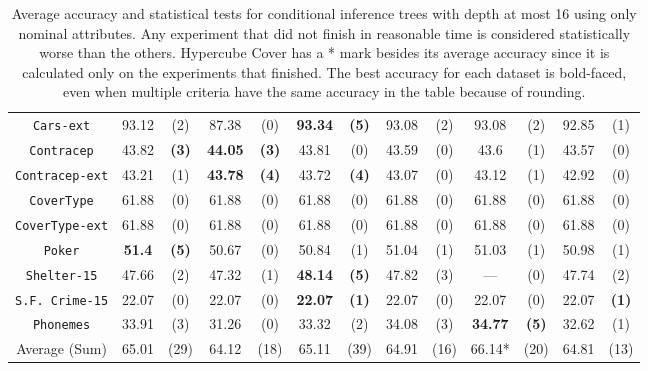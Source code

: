 \begin{table}
\begin{tabular}{c|cc|cc|cc|cc|cc|cc}
{\tt Cars-ext}      & 93.12      &  (2)              &   87.38      & (0)             & {\bf 93.34} &  {\bf (5)}           & 93.08       & (2)             & 93.08       & (2)         & 92.85       & (1)         \\
{\tt Contracep}     & 43.82      &  {\bf (3)}        &   {\bf 44.05}& {\bf (3)}       &  43.81      &  (0)                 & 43.59       & (0)             & 43.6        & (1)         & 43.57       & (0)         \\
{\tt Contracep-ext} & 43.21      &  (1)              &   {\bf 43.78}& {\bf (4)}       &  43.72      &  {\bf (4)}           & 43.07       & (0)             & 43.12       & (1)         & 42.92       & (0)         \\
{\tt CoverType}     & 61.88      &  (0)              &   61.88      & (0)             &  61.88      &  (0)                 & 61.88       & (0)             & 61.88       & (0)         & 61.88       & (0)         \\
{\tt CoverType-ext} & 61.88      &  (0)              &   61.88      & (0)             &  61.88      &  (0)                 & 61.88       & (0)             & 61.88       & (0)         & 61.88       & (0)         \\
{\tt Poker}         & {\bf 51.4} &  {\bf (5)}        &   50.67      & (0)             &  50.84      &  (1)                 & 51.04       & (1)             & 51.03       & (1)         & 50.98       & (1)         \\
{\tt Shelter-15}    & 47.66      &  (2)              &   47.32      & (1)             & {\bf 48.14} &  {\bf (5)}           & 47.82       & (3)             & ---         & (0)         & 47.74       & (2)         \\
{\tt S.F. Crime-15} & 22.07      &  (0)              &   22.07      & (0)             & {\bf 22.07} &  {\bf (1)}           & 22.07       & (0)             & 22.07       & (0)         & 22.07       & {\bf (1)}   \\
{\tt Phonemes}      & 33.91      &  (3)              &   31.26      & (0)             &  33.32      &  (2)                 & 34.08       & (3)             & {\bf 34.77} & {\bf (5)}   & 32.62       & (1)         \\
\hline
Average (Sum)       & 65.01      &  (29)             &   64.12      & (18)            &  65.11      &  (39)                & 64.91       & (16)            & 66.14*      & (20)        & 64.81       & (13)
       \end{tabular}
        \caption{Average accuracy and statistical tests  for  conditional inference trees 
with depth at most 16 using only nominal attributes. Any experiment that did not finish in reasonable time is considered statistically worse than the others. Hypercube Cover has a * mark besides its average accuracy since it is calculated only on the experiments that finished. The best accuracy for each dataset is bold-faced, even when multiple criteria have the same accuracy in the table because of rounding.}
\label{tab:ctree-16}
\normalsize
\end{table}


